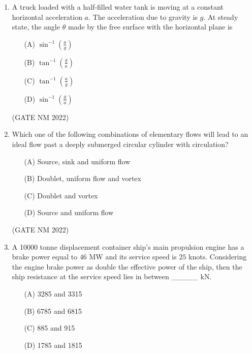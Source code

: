 \documentclass[journal,12pt,onecolumn]{IEEEtran}
\theoremstyle{remark}
\begin{document}
\begin{enumerate}
\item  A truck loaded with a half-filled water tank is moving at a constant horizontal acceleration $a$. The acceleration due to gravity is $g$. At steady state, the angle $\theta$ made by the free surface with the horizontal plane is

\begin{enumerate}
    \item[(A)] $\sin^{-1}\!\left(\frac{a}{g}\right)$
    \item[(B)] $\tan^{-1}\!\left(\frac{g}{a}\right)$
    \item[(C)] $\tan^{-1}\!\left(\frac{a}{g}\right)$
    \item[(D)] $\sin^{-1}\!\left(\frac{g}{a}\right)$
\end{enumerate}

\hfill(GATE NM 2022)





\item  Which one of the following combinations of elementary flows will lead to an ideal flow past a deeply submerged circular cylinder with circulation?

\begin{enumerate}
    \item[(A)] Source, sink and uniform flow
    \item[(B)] Doublet, uniform flow and vortex
    \item[(C)] Doublet and vortex
    \item[(D)] Source and uniform flow
\end{enumerate}

\hfill(GATE NM 2022)





\item  A 10000 tonne displacement container ship's main propulsion engine has a brake power equal to $46$ MW  and its service speed is $25$ knots. Considering the engine brake power as double the effective power of the ship, then the ship resistance at the service speed lies in between \_\_\_\_\_  kN.

\begin{enumerate}
    \item[(A)] 3285 and 3315
    \item[(B)] 6785 and 6815
    \item[(C)] 885 and 915
    \item[(D)] 1785 and 1815
\end{enumerate}


\end{enumerate}
\end{document}
